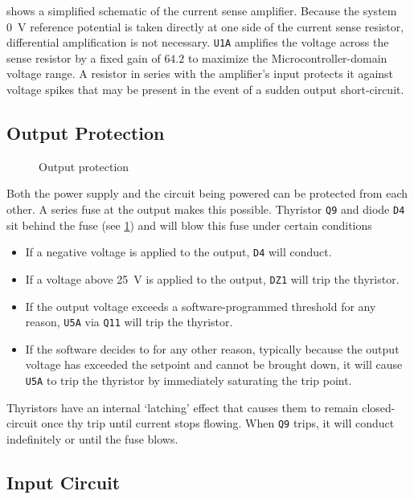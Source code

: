 \documentclass[letterpaper,twocolumn,10pt,openany,oneside,final,fleqn]{memoir}
\newcommand{\rd}[1]{\texttt{#1}}
\newcommand{\xcircuit}[1]{ \centering \textsf{  } }
\begin{document}
 shows a simplified schematic of the current sense amplifier.
Because the system \SI{0}{V} reference potential is taken directly at one side of the
current sense resistor, differential amplification is not necessary. \rd{U1A} amplifies
the voltage across the sense resistor by a fixed gain of $64.2$ to maximize the
Microcontroller-domain voltage range. A resistor in series with the amplifier's
input protects it against voltage spikes that may be present in the event of a sudden
output short-circuit.

\subsection{Output Protection}

\begin{figure}
\xcircuit{outputprot}
\caption{Output protection}
\label{fig:outputprot}
\end{figure}

Both the power supply and the circuit being powered can be protected from each other.
A series fuse at the output makes this possible. Thyristor \rd{Q9} and diode \rd{D4}
sit behind the fuse (see \cref{fig:outputprot}) and
will blow this fuse under certain conditions

\begin{itemize}
    \item{If a negative voltage is applied to the output, \rd{D4} will conduct.}
    \item{If a voltage above \SI{25}{V} is applied to the output, \rd{DZ1} will
        trip the thyristor.}
    \item{If the output voltage exceeds a software-programmed threshold for any
        reason, \rd{U5A} via \rd{Q11} will trip the thyristor.}
    \item{If the software decides to for any other reason, typically because the
        output voltage has exceeded the setpoint and cannot be brought down,
        it will cause \rd{U5A} to trip the thyristor by immediately saturating
        the trip point.}
\end{itemize}

Thyristors have an internal `latching' effect that causes them to remain closed-circuit
once thy trip until current stops flowing. When \rd{Q9} trips, it will conduct indefinitely
or until the fuse blows.

\subsection{Input Circuit}
\end{document}
